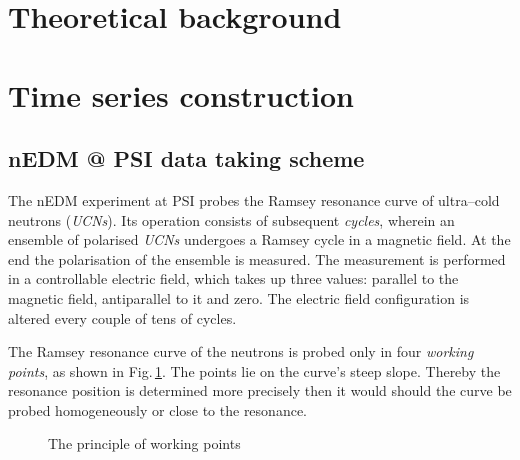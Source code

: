 \section{Theoretical background}


\section{Time series construction}

\subsection{nEDM @ PSI data taking scheme}
The nEDM experiment at PSI probes the Ramsey resonance curve of ultra--cold neutrons (\emph{UCNs}). Its operation consists of subsequent \emph{cycles}, wherein an ensemble of polarised \emph{UCNs} undergoes a Ramsey cycle in a magnetic field. At the end the polarisation of the ensemble is measured. The measurement is performed in a controllable electric field, which takes up three values: parallel to the magnetic field, antiparallel to it and zero. The electric field configuration is altered every couple of tens of cycles.

The Ramsey resonance curve of the neutrons is probed only in four \emph{working points}, as shown in Fig.\,\ref{fig:axions_working_points}. The points lie on the curve's steep slope. Thereby the resonance position is determined more precisely then it would should the curve be probed homogeneously or close to the resonance.

\begin{figure}[bth]
  \myfloatalign
  \quad
  \caption{The principle of working points}
  \label{fig:axions_working_points}
\end{figure}


